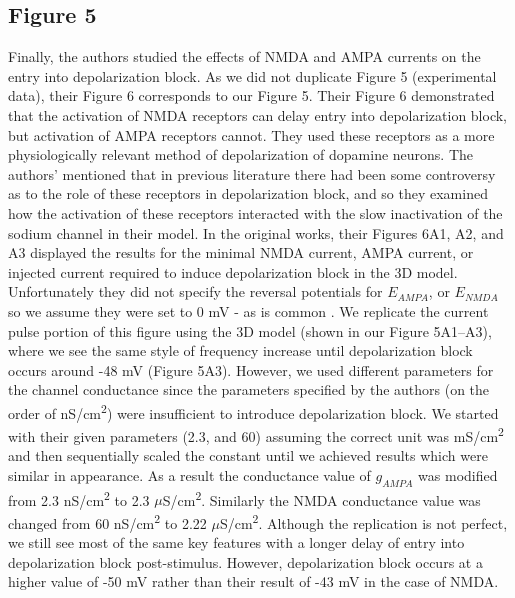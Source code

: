 \subsection{Figure 5}
Finally, the authors studied the effects of NMDA and AMPA currents on the entry into depolarization block. As we did not duplicate Figure 5 (experimental data), their Figure 6 corresponds to our Figure 5. Their Figure 6 demonstrated that the activation of NMDA receptors can delay entry into depolarization block, but activation of AMPA receptors cannot. They used these receptors as a more physiologically relevant method of depolarization of dopamine neurons. The authors’ mentioned that in previous literature there had been some controversy as to the role of these receptors in depolarization block, and so they examined how the activation of these receptors interacted with the slow inactivation of the sodium channel in their model. In the original works, their Figures 6A1, A2, and A3 displayed the results for the minimal NMDA current, AMPA current, or injected current required to induce depolarization block in the 3D model. Unfortunately they did not specify the reversal potentials for $E_{AMPA}$, or $E_{NMDA}$ so we assume they were set to 0 mV - as is common \cite{neuroscience_2001}. We replicate the current pulse portion of this figure using the 3D model (shown in our Figure 5A1--A3), where we see the same style of frequency increase until depolarization block occurs around -48 mV (Figure 5A3). However, we used different parameters for the channel conductance since the parameters specified by the authors (on the order of nS/cm\textsuperscript{2}) were insufficient to introduce depolarization block. We started with their given parameters (2.3, and 60) assuming the correct unit was mS/cm\textsuperscript{2} and then sequentially scaled the constant until we achieved results which were similar in appearance. As a result the conductance value of $g_{AMPA}$ was modified from 2.3 nS/cm\textsuperscript{2} to 2.3 $\mu$S/cm\textsuperscript{2}. Similarly the NMDA conductance value was changed from 60 nS/cm\textsuperscript{2} to 2.22 $\mu$S/cm\textsuperscript{2}. Although the replication is not perfect, we still see most of the same key features with a longer delay of entry into depolarization block post-stimulus. However, depolarization block occurs at a higher value of -50 mV rather than their result of -43 mV in the case of NMDA.\\

